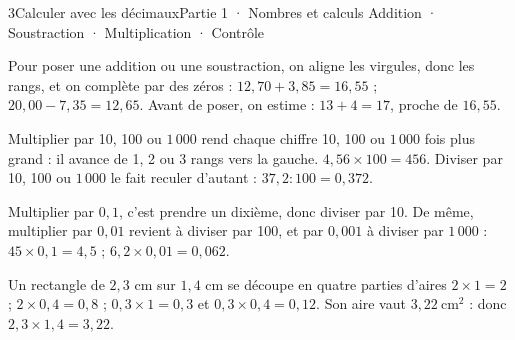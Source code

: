 \begin{ouverture}[calcul]{3}{Calculer avec les décimaux}{Partie 1 · Nombres et calculs}
{Addition · Soustraction · Multiplication · Contrôle}
\end{ouverture}
\pagestyle{otMain}\essentiel\fontsize{11}{15}\selectfont
{}\label{cours-3-1}
\begin{savoirfaire}Pour poser une addition ou une soustraction, on aligne les virgules, donc les rangs, et on complète par des zéros : $12{,}70+3{,}85=16{,}55$ ; $20{,}00-7{,}35=12{,}65$. Avant de poser, on estime : $13+4=17$, proche de $16{,}55$.\end{savoirfaire}
\begin{propriete}Multiplier par 10, 100 ou $1\,000$ rend chaque chiffre 10, 100 ou $1\,000$ fois plus grand : il avance de 1, 2 ou 3 rangs vers la gauche. $4{,}56\times100=456$. Diviser par 10, 100 ou $1\,000$ le fait reculer d’autant : $37{,}2:100=0{,}372$.\end{propriete}
\label{fig-cours-3-1-cours-glisse}

\begin{propriete}Multiplier par $0{,}1$, c’est prendre un dixième, donc diviser par 10. De même, multiplier par $0{,}01$ revient à diviser par 100, et par $0{,}001$ à diviser par $1\,000$ : $45\times0{,}1=4{,}5$ ; $6{,}2\times0{,}01=0{,}062$.\end{propriete}
\clearpage
{}\label{cours-3-2}
\begin{exemple}Un rectangle de $2{,}3$ cm sur $1{,}4$ cm se découpe en quatre parties d’aires $2\times1=2$ ; $2\times0{,}4=0{,}8$ ; $0{,}3\times1=0{,}3$ et $0{,}3\times0{,}4=0{,}12$. Son aire vaut $3{,}22\ \mathrm{cm}^2$ : donc $2{,}3\times1{,}4=3{,}22$.\end{exemple}
\label{fig-cours-3-2-cours-rectangle-produit}

